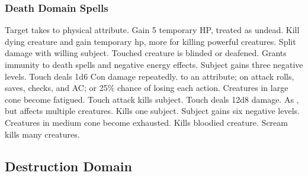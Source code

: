 \subsubsection{Death Domain Spells}
\begin{spelllist}
   Target takes  to physical attribute.
   Gain 5 temporary HP, treated as undead.
   Kill dying creature and gain temporary hp, more for killing powerful creatures.
    Split damage with willing subject.
   Touched creature is blinded or deafened.
   Grants immunity to death spells and negative energy effects.
   Subject gains three negative levels.
   Touch deals 1d6 Con damage repeatedly.
    to an attribute;  on attack rolls, saves, checks, and AC; or 25\% chance of losing each action.
   Creatures in large cone become fatigued.
   Touch attack kills subject.
   Touch deals 12d8 damage.
   As , but affects multiple creatures.
   Kills one subject.
   Subject gains six negative levels.
   Creatures in medium cone become exhausted.
   Kills bloodied creature.
   Scream kills many creatures. 
\end{spelllist}

\subsection{Destruction Domain}

